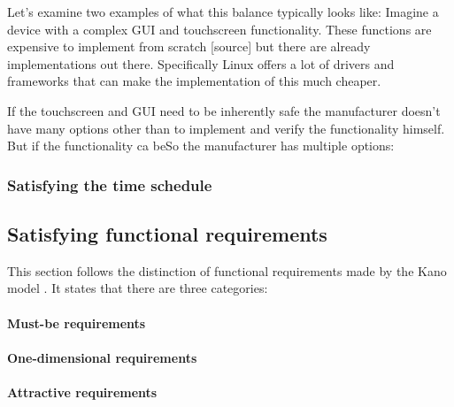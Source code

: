 Let’s examine two examples of what this balance typically looks like: Imagine a device with a complex GUI and touchscreen functionality. These functions are expensive to implement from scratch [source] but there are already implementations out there. Specifically Linux offers a lot of drivers and frameworks that can make the implementation of this much cheaper. 

If the touchscreen and GUI need to be inherently safe the manufacturer doesn’t have many options other than to implement and verify the functionality himself. But if the functionality ca beSo the manufacturer has multiple options:   

\subsubsection{Satisfying the time schedule}
\subsection{Satisfying functional requirements}
This section follows the distinction of functional requirements made by the  Kano model \autocite{KanoNoriaki.1984}. 
It states that there are three categories: 
\paragraph{Must-be requirements}  \autocite{ElmarSauerwein.1996}

\paragraph{One-dimensional requirements} \autocite{ElmarSauerwein.1996} 

\paragraph{Attractive requirements} \autocite{ElmarSauerwein.1996}

